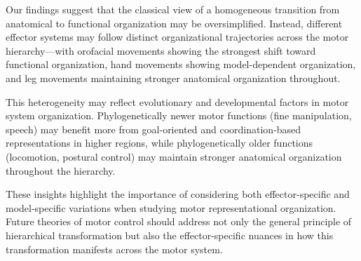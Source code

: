 \documentclass{article}
\begin{document}
Our findings suggest that the classical view of a homogeneous transition from anatomical to functional organization may be oversimplified. Instead, different effector systems may follow distinct organizational trajectories across the motor hierarchy—with orofacial movements showing the strongest shift toward functional organization, hand movements showing model-dependent organization, and leg movements maintaining stronger anatomical organization throughout.

This heterogeneity may reflect evolutionary and developmental factors in motor system organization. Phylogenetically newer motor functions (fine manipulation, speech) may benefit more from goal-oriented and coordination-based representations in higher regions, while phylogenetically older functions (locomotion, postural control) may maintain stronger anatomical organization throughout the hierarchy.

These insights highlight the importance of considering both effector-specific and model-specific variations when studying motor representational organization. Future theories of motor control should address not only the general principle of hierarchical transformation but also the effector-specific nuances in how this transformation manifests across the motor system.











\end{document}
